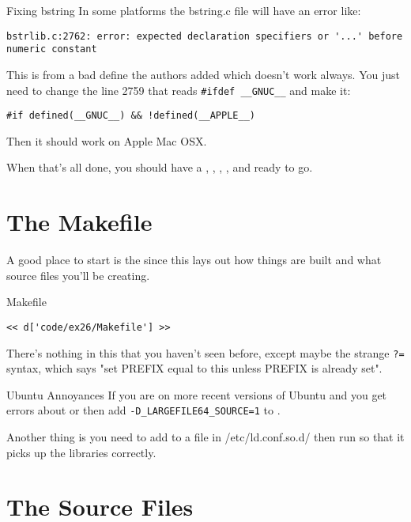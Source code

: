 \begin{aside}{Fixing bstring}
In some platforms the bstring.c file will have an error like:

\begin{lstlisting}
bstrlib.c:2762: error: expected declaration specifiers or '...' before numeric constant
\end{lstlisting}

This is from a bad define the authors added which doesn't work always.
You just need to change the line 2759 that reads \verb|#ifdef __GNUC__|
and make it:

\verb|#if defined(__GNUC__) && !defined(__APPLE__)|

Then it should work on Apple Mac OSX.

\end{aside}

When that's all done, you should have a , ,
, , and  ready to go.

\section{The Makefile}

A good place to start is the  since this lays out 
how things are built and what source files you'll be creating.

\begin{code}{Makefile}
\begin{lstlisting}
<< d['code/ex26/Makefile'] >>
\end{lstlisting}
\end{code}

There's nothing in this that you haven't seen before, except maybe the strange
\verb|?=| syntax, which says "set PREFIX equal to this unless PREFIX is already
set".

\begin{aside}{Ubuntu Annoyances}
If you are on more recent versions of Ubuntu and you get errors about  or  then add \verb|-D_LARGEFILE64_SOURCE=1| to .

Another thing is you need to add  to a file in
/etc/ld.conf.so.d/ then run  so that it picks up
the libraries correctly.
\end{aside}


\section{The Source Files}

